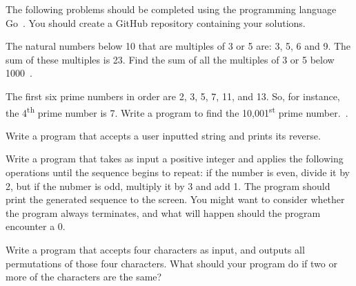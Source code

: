 

\noindent
The following problems should be completed using the programming language Go~\cite{gowebsite}.
You should create a GitHub repository containing your solutions.


\begin{questions}


\question
The natural numbers below 10 that are multiples of 3 or 5 are: 3, 5, 6 and 9.
The sum of these multiples is 23.
Find the sum of all the multiples of 3 or 5 below 1000~\cite{projecteuler}.
\begin{solution}
\end{solution}


\question
The first six prime numbers in order are 2, 3, 5, 7, 11, and 13.
So, for instance, the 4\textsuperscript{th} prime number is 7.
Write a program to find the 10,001\textsuperscript{st} prime number.~\cite{projecteuler}.
\begin{solution}
\end{solution}


\question
Write a program that accepts a user inputted string and prints its reverse.
\begin{solution}
\end{solution}


\question
Write a program that takes as input a positive integer and applies the following operations until the sequence begins to repeat: if the number is even, divide it by 2, but if the nubmer is odd, multiply it by 3 and add 1.
The program should print the generated sequence to the screen.
You might want to consider whether the program always terminates, and what will happen should the program encounter a 0. 
\begin{solution}
\end{solution}


\question
Write a program that accepts four characters as input, and outputs all permutations of those four characters.
What should your program do if two or more of the characters are the same?
\begin{solution}
\end{solution}


\end{questions}
